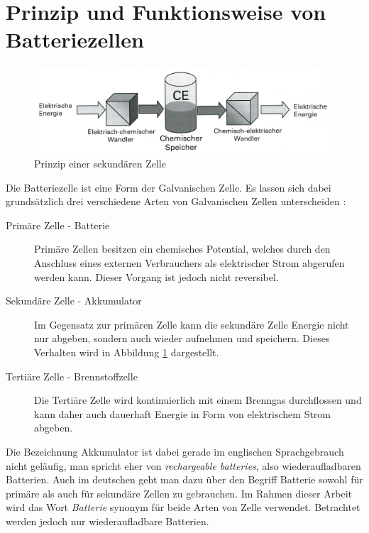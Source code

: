 \documentclass[a4paper, 11pt, headsepline,footsepline,twoside,abstract]{scrbook}
\begin{document}
\section{Prinzip und Funktionsweise von Batteriezellen}
\begin{figure}
	\centering
	\includegraphics[width=1.0\columnwidth]{images/Prinzipieller_Aufbau.jpg}
	\caption{Prinzip einer sekundären Zelle \cite{jossen_2006}}
	\label{Prinzip_Zelle}
\end{figure}
Die Batteriezelle ist eine Form der Galvanischen Zelle. Es lassen sich dabei grundsätzlich drei verschiedene Arten von Galvanischen Zellen unterscheiden \cite{jossen_2006}:
\begin{description}
\item[Primäre Zelle - Batterie] Primäre Zellen besitzen ein chemisches Potential, welches durch den Anschluss eines externen Verbrauchers als elektrischer Strom abgerufen werden kann. Dieser Vorgang ist jedoch nicht reversibel.
\item[Sekundäre Zelle - Akkumulator] Im Gegensatz zur primären Zelle kann die sekundäre Zelle Energie nicht nur abgeben, sondern auch wieder aufnehmen und speichern. Dieses Verhalten wird in Abbildung \ref{Prinzip_Zelle} dargestellt.
\item[Tertiäre Zelle - Brennstoffzelle] Die Tertiäre Zelle wird kontinuierlich mit einem Brenngas durchflossen und kann daher auch dauerhaft Energie in Form von elektrischem Strom abgeben.  
\end{description}
Die Bezeichnung Akkumulator ist dabei gerade im englischen Sprachgebrauch nicht geläufig, man spricht eher von \textit{rechargeable batteries}, also wiederaufladbaren Batterien. Auch im deutschen geht man dazu über den Begriff Batterie sowohl für primäre als auch für sekundäre Zellen zu gebrauchen. Im Rahmen dieser Arbeit wird das Wort \textit{Batterie} synonym für beide Arten von Zelle verwendet. Betrachtet werden jedoch nur wiederaufladbare Batterien.
\end{document}
